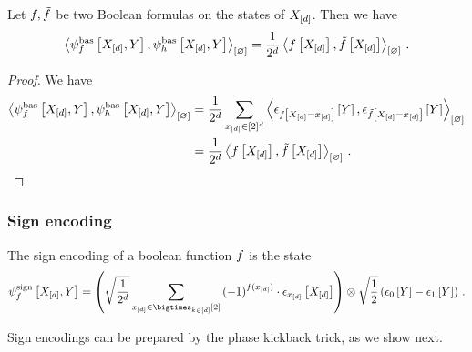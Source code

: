 \begin{lemma}
    \label{lem:basQstateOverlap}
    Let $f,\tilde{f}$ be two Boolean formulas on the states of $X_{[d]}$.
    Then we have
    \begin{align*}
        \left\langle \psi^{\mathrm{bas}}_{f}\left[X_{[d]},Y\right],\psi^{\mathrm{bas}}_{h}\left[X_{[d]},Y\right]\right\rangle_{\left[ \varnothing \right]}
        = \frac{1}{2^{d}} \left\langle f\left[X_{[d]}\right],\tilde{f}\left[X_{[d]}\right]\right\rangle_{\left[ \varnothing \right]} \, .
    \end{align*}
\end{lemma}
\begin{proof}
    We have
    \begin{align*}
        \left\langle \psi^{\mathrm{bas}}_{f}\left[X_{[d]},Y\right],\psi^{\mathrm{bas}}_{h}\left[X_{[d]},Y\right]\right\rangle_{\left[ \varnothing \right]}
        &= \frac{1}{2^{d}}
        \sum_{x_{[d]}\in[2]^{d}} \left\langle \epsilon_{f\left[X_{[d]}=x_{[d]}\right]}\left[Y\right],\epsilon_{\tilde{f}\left[X_{[d]}=x_{[d]}\right]}\left[Y\right]\right\rangle_{\left[ \varnothing \right]} \\
        &= \frac{1}{2^{d}} \left\langle f\left[X_{[d]}\right],\tilde{f}\left[X_{[d]}\right]\right\rangle_{\left[ \varnothing \right]} \, .
    \end{align*}
\end{proof}

\subsubsection{Sign encoding}

\begin{definition}
    The sign encoding of a boolean function $f$ is the state
    \begin{align*}
        \signqstateofat{\exformula}{\shortcatvariables,\headvariable}
        = \left(\sqrt{\frac{1}{2^\atomorder}} \sum_{\shortcatindices\in\atomstates} \left(-1\right)^{\exformula(\shortcatindices)} \cdot \onehotmapofat{\shortcatindices}{\shortcatvariables}\right)
        \otimes \sqrt{\frac{1}{2}} \left(\fbasisat{\headvariable} - \tbasisat{\headvariable}\right) \, .
    \end{align*}
\end{definition}

Sign encodings can be prepared by the phase kickback trick, as we show next.

